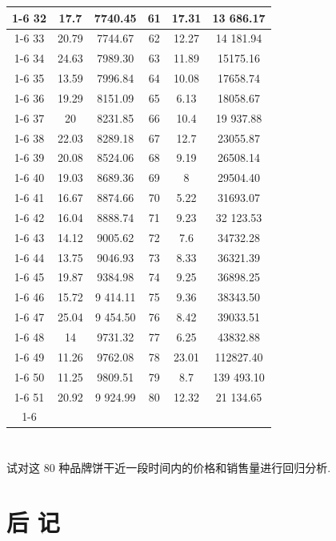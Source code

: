 \documentclass[10pt]{article}
\begin{document}
\begin{center}
{\begin{tabular}{|c|c|c|c|c|c|}
\cline{1-6}
32 & 17.7 & 7740.45 & 61 & 17.31 & 13 686.17 \\
\cline{1-6}
33 & 20.79 & 7744.67 & 62 & 12.27 & 14 181.94 \\
\cline{1-6}
34 & 24.63 & 7989.30 & 63 & 11.89 & 15175.16 \\
\cline{1-6}
35 & 13.59 & 7996.84 & 64 & 10.08 & 17658.74 \\
\cline{1-6}
36 & 19.29 & 8151.09 & 65 & 6.13 & 18058.67 \\
\cline{1-6}
37 & 20 & 8231.85 & 66 & 10.4 & 19 937.88 \\
\cline{1-6}
38 & 22.03 & 8289.18 & 67 & 12.7 & 23055.87 \\
\cline{1-6}
39 & 20.08 & 8524.06 & 68 & 9.19 & 26508.14 \\
\cline{1-6}
40 & 19.03 & 8689.36 & 69 & 8 & 29504.40 \\
\cline{1-6}
41 & 16.67 & 8874.66 & 70 & 5.22 & 31693.07 \\
\cline{1-6}
42 & 16.04 & 8888.74 & 71 & 9.23 & 32 123.53 \\
\cline{1-6}
43 & 14.12 & 9005.62 & 72 & 7.6 & 34732.28 \\
\cline{1-6}
44 & 13.75 & 9046.93 & 73 & 8.33 & 36321.39 \\
\cline{1-6}
45 & 19.87 & 9384.98 & 74 & 9.25 & 36898.25 \\
\cline{1-6}
46 & 15.72 & 9 414.11 & 75 & 9.36 & 38343.50 \\
\cline{1-6}
47 & 25.04 & 9 454.50 & 76 & 8.42 & 39033.51 \\
\cline{1-6}
48 & 14 & 9731.32 & 77 & 6.25 & 43832.88 \\
\cline{1-6}
49 & 11.26 & 9762.08 & 78 & 23.01 & 112827.40 \\
\cline{1-6}
50 & 11.25 & 9809.51 & 79 & 8.7 & 139 493.10 \\
\cline{1-6}
51 & 20.92 & 9 924.99 & 80 & 12.32 & 21 134.65 \\
\cline{1-6}
\hline
\end{tabular}
}
\end{center}

\section*{}

试对这 80 种品牌饼干近一段时间内的价格和销售量进行回归分析.



\section*{后 记}
\end{document}
